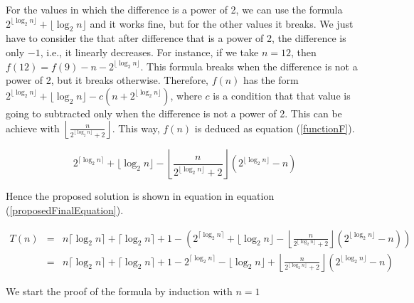 \documentclass[12pt]{scrartcl}
\begin{document}
\begin{enumerate}
	For the values in which the difference is a power of 2, we can use the formula $2^{\lfloor \log_2 n \rfloor} + \lfloor \log_2 n \rfloor$ and it works fine, but for the other values it breaks. We just have to consider the that after difference that is a power of 2, the difference is only $-1$, i.e., it linearly decreases. For instance, if we take $n = 12$, then $f(12) = f(9) - n - 2^{\lfloor \log_2 n \rfloor}$. This formula breaks when the difference is not a power of 2, but it breaks otherwise. Therefore, $f(n)$ has the form $2^{\lfloor \log_2 n \rfloor} + \lfloor \log_2 n \rfloor -  c\left(n + 2^{\lfloor \log_2 n \rfloor} \right)$, where $c$ is a condition that that value is going to subtracted only when the difference is not a power of 2. This can be achieve with $\left\lfloor \frac{n}{2^{\lfloor \log_2 n \rfloor} + 2} \right\rfloor$. This way, $f(n)$ is deduced as equation (\ref{functionF}).
	
	
	\begin{equation}\label{functionF}
		2^{\lceil \log_2 n \rceil } + \lfloor \log_2 n \rfloor - \left\lfloor \frac{n}{2^{\lfloor \log_2 n \rfloor} + 2} \right\rfloor \left( 2^{\lfloor \log_2 n \rfloor} - n \right)
	\end{equation}
	
	Hence the proposed solution is shown in equation in equation (\ref{proposedFinalEquation}).
	
	\begin{eqnarray}
	T(n) 	&	= 	&	n \lceil \log_2 n \rceil + \lceil \log_2 n \rceil + 1 - \left( 2^{\lceil \log_2 n \rceil } + \lfloor \log_2 n \rfloor - \left\lfloor \frac{n}{2^{\lfloor \log_2 n \rfloor} + 2} \right\rfloor \left( 2^{\lfloor \log_2 n \rfloor} - n \right) \right) \nonumber \\
		&	=	&n \lceil \log_2 n \rceil + \lceil \log_2 n \rceil + 1 -  2^{\lceil \log_2 n \rceil} - \lfloor \log_2 n \rfloor + \left\lfloor \frac{n}{2^{\lfloor \log_2 n \rfloor} + 2} \right\rfloor \left( 2^{\lfloor \log_2 n \rfloor} - n \right)  \label{proposedFinalEquation}
	\end{eqnarray}
	
	We start the proof of the formula by induction with $n = 1$
	
\end{enumerate}
\end{document}
